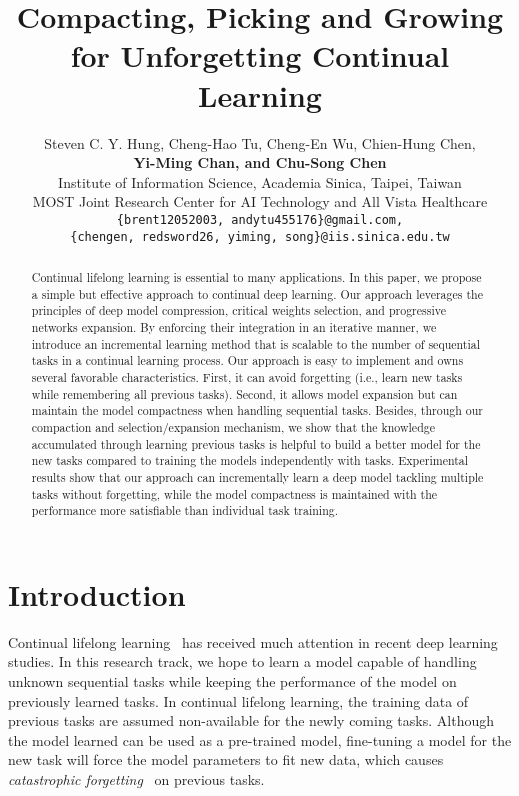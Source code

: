 \documentclass{article}
\title{Compacting, Picking and Growing for Unforgetting Continual Learning}
\author{
Steven C. Y. Hung, Cheng-Hao Tu, Cheng-En Wu, Chien-Hung Chen, \\
    \textbf{Yi-Ming Chan, and Chu-Song Chen}\\
    Institute of Information Science, Academia Sinica, Taipei, Taiwan \\
 	MOST Joint Research Center for AI Technology and All Vista Healthcare\\
 	\texttt{\{brent12052003, andytu455176\}@gmail.com,}\\
 	\texttt{\{chengen, redsword26, yiming, song\}@iis.sinica.edu.tw}
}
\begin{document}
\maketitle

\begin{abstract}
  Continual lifelong learning is essential to many applications.
  In this paper, we propose a simple but effective approach to continual deep learning.
  Our approach leverages the principles of deep model compression, critical weights selection, and progressive networks expansion.
  By enforcing their integration in an iterative manner, we introduce an incremental learning method that is scalable to the number of sequential tasks in a continual learning process.
  Our approach is easy to implement and owns several favorable characteristics. 
  First, it can avoid forgetting (i.e., learn new tasks while remembering all previous tasks).
  Second, it allows model expansion but can maintain the model compactness when handling sequential tasks.
  Besides, through our compaction and selection/expansion mechanism, we show that the knowledge accumulated through learning previous tasks is helpful to build a better model for the new tasks compared to training the models independently with tasks.
  Experimental results show that our approach can incrementally learn a deep model tackling multiple tasks without forgetting, while the model compactness is maintained with the performance more satisfiable than individual task training.
\end{abstract}

\section{Introduction}
Continual lifelong learning~\cite{thrun1995lifelong,lifelong_review19} has received much attention in recent deep learning studies.
In this research track, we hope to learn a model capable of handling unknown sequential tasks while keeping the performance of the model on previously learned tasks.
In continual lifelong learning, the training data of previous tasks are assumed non-available for the newly coming tasks.
Although the model learned can be used as a pre-trained model, fine-tuning a model for the new task will force the model parameters to fit new data, which causes \textit{catastrophic forgetting}~\cite{mcclelland1995there,Pfulb2019ACA} on previous tasks.
\end{document}
